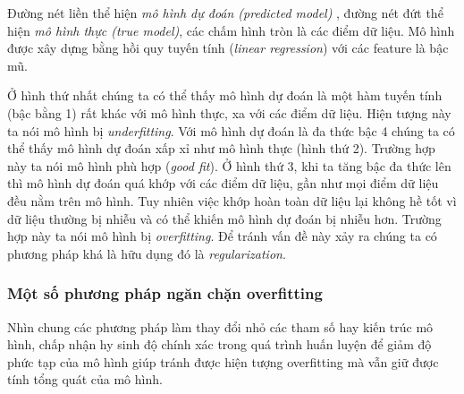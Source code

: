 Đường nét liền thể hiện \textit{mô hình dự đoán (predicted model)} , đường nét đứt thể hiện \textit{mô hình thực (true model)}, các chấm hình tròn là các điểm dữ liệu. Mô hình được xây dựng bằng hồi quy tuyến tính (\textit{linear regression}) với các feature là bậc mũ.\par
Ở hình thứ nhất chúng ta có thể thấy mô hình dự đoán là một hàm tuyến tính (bậc bằng 1) rất khác với mô hình thực, xa với các điểm dữ liệu. Hiện tượng này ta nói mô hình bị \textit{underfitting}.
Với mô hình dự đoán là đa thức bậc 4 chúng ta có thể thấy mô hình dự đoán xấp xỉ như mô hình thực (hình thứ 2). Trường hợp này ta nói mô hình phù hợp (\textit{good fit}). Ở hình thứ 3, khi ta tăng bậc đa thức lên thì mô hình dự đoán quá khớp với các điểm dữ liệu, gần như mọi điểm dữ liệu đều nằm trên mô hình. Tuy nhiên việc khớp hoàn toàn dữ liệu lại không hề tốt vì dữ liệu thường bị nhiễu và có thể khiến mô hình dự đoán bị nhiễu hơn. Trường hợp này ta nói mô hình bị\textit{ overfitting}. Để tránh vấn đề này xảy ra chúng ta có phương pháp khá là hữu dụng đó là \textit{regularization}.

\subsubsection{Một số phương pháp ngăn chặn overfitting}
Nhìn chung các phương pháp làm thay đổi nhỏ các tham số hay kiến trúc mô hình, chấp nhận hy sinh độ chính xác trong quá trình huấn luyện để giảm độ phức tạp của mô hình giúp tránh được hiện tượng overfitting mà vẫn giữ được tính tổng quát của mô hình.

